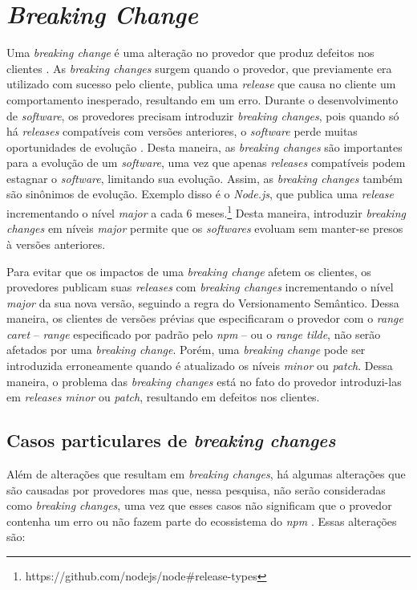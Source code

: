 \section{\textit{Breaking Change}}
\label{ref-teo:breaking_change}
Uma \textit{breaking change} é uma alteração no provedor que produz defeitos nos clientes \cite{teorical_reference:semver}. As \textit{breaking changes} surgem quando o provedor, que previamente era utilizado com sucesso pelo cliente, publica uma \textit{release} que causa no cliente um comportamento inesperado, resultando em um erro. Durante o desenvolvimento de \textit{software}, os provedores precisam introduzir \textit{breaking changes}, pois quando só há \textit{releases} compatíveis com versões anteriores, o \textit{software} perde muitas oportunidades de evolução \cite{teorical_reference:bc_2}. Desta maneira, as \textit{breaking changes} são importantes para a evolução de um \textit{software}, uma vez que apenas \textit{releases} compatíveis podem estagnar o \textit{software}, limitando sua evolução. Assim, as \textit{breaking changes} também são sinônimos de evolução. Exemplo disso é o \textit{Node.js}, que publica uma \textit{release} incrementando o nível \textit{major} a cada 6 meses.\footnote{https://github.com/nodejs/node\#release-types} Desta maneira, introduzir \textit{breaking changes} em níveis \textit{major} permite que os \textit{softwares} evoluam sem manter-se presos à versões anteriores.

Para evitar que os impactos de uma \textit{breaking change} afetem os clientes, os provedores publicam suas \textit{releases} com \textit{breaking changes} incrementando o nível \textit{major} da sua nova versão, seguindo a regra do Versionamento Semântico. Dessa maneira, os clientes de versões prévias que especificaram o provedor com o \textit{range caret} -- \textit{range} especificado por padrão pelo \textit{npm} -- ou o \textit{range tilde}, não serão afetados por uma \textit{breaking change}. Porém, uma \textit{breaking change} pode ser introduzida erroneamente quando é atualizado os níveis \textit{minor} ou \textit{patch}. Dessa maneira, o problema das \textit{breaking changes} está no fato do provedor introduzi-las em \textit{releases minor} ou \textit{patch}, resultando em defeitos nos clientes.

\subsection{Casos particulares de \textit{breaking changes}}
Além de alterações que resultam em \textit{breaking changes}, há algumas alterações que são causadas por provedores mas que, nessa pesquisa, não serão consideradas como \textit{breaking changes}, uma vez que esses casos não significam que o provedor contenha um erro ou não fazem parte do ecossistema do \textit{npm} . Essas alterações são:

